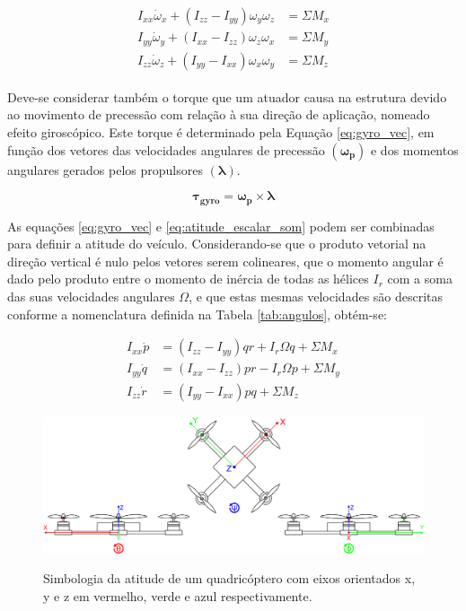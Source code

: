 \documentclass[main.tex]{subfiles}
\begin{document}
\begin{align}\label{eq:revisao_coriolis_escalar}
    \begin{split}
        I_{xx}\dot{\omega}_{x} + (I_{zz} - I_{yy})\omega_y\omega_z &= \Sigma M_x\\
        I_{yy}\dot{\omega}_{y} + (I_{xx} - I_{zz})\omega_z\omega_x &= \Sigma M_y\\
        I_{zz}\dot{\omega}_{z} + (I_{yy} - I_{xx})\omega_x\omega_y &= \Sigma M_z
    \end{split}
\end{align}

Deve-se considerar também o torque que um atuador causa na estrutura devido ao movimento de precessão com relação à sua direção de aplicação, nomeado efeito giroscópico. Este torque é determinado pela Equação \ref{eq:gyro_vec}, em função dos vetores das velocidades angulares de precessão $(\boldsymbol{\omega_p})$ e dos momentos angulares gerados pelos propulsores $(\boldsymbol{\lambda})$.

\begin{equation}\label{eq:gyro_vec}
    \boldsymbol{\tau_{gyro}} = \boldsymbol{\omega_p}\times\boldsymbol{\lambda}
\end{equation}

As equações \ref{eq:gyro_vec} e \ref{eq:atitude_escalar_som} podem ser combinadas para definir a atitude do veículo. Considerando-se que o produto vetorial na direção vertical é nulo pelos vetores serem colineares, que o momento angular é dado pelo produto entre o momento de inércia de todas as hélices $I_r$ com a soma das suas velocidades angulares $\Omega$, e que estas mesmas velocidades são descritas conforme a nomenclatura definida na Tabela \ref{tab:angulos}, obtém-se:

\begin{equation}\label{eq:atitude_escalar_som}
    \begin{split}
        I_{xx}\dot{p} &= (I_{zz} - I_{yy})qr + I_r\Omega q + \Sigma M_x\\
        I_{yy}\dot{q} &= (I_{xx} - I_{zz})pr - I_r\Omega p + \Sigma M_y\\
        I_{zz}\dot{r} &= (I_{yy} - I_{xx})pq + \Sigma M_z
    \end{split}
\end{equation}

\begin{figure}[!h]
    \centering
    \caption{Simbologia da atitude de um quadricóptero com eixos orientados x, y e z em vermelho, verde e azul respectivamente.}
    \includegraphics[width=1\textwidth]{capitulos/modelagem/imgs/drone_orientation.png}
    \label{fig:drone_orientations}
\end{figure}
\end{document}
